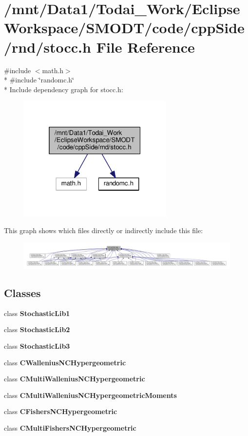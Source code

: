 \section{/mnt/\-Data1/\-Todai\-\_\-\-Work/\-Eclipse\-Workspace/\-S\-M\-O\-D\-T/code/cpp\-Side/rnd/stocc.h File Reference}
\label{rnd_2stocc_8h}
{\ttfamily \#include $<$math.\-h$>$}\\*
{\ttfamily \#include \char`\"{}randomc.\-h\char`\"{}}\\*
Include dependency graph for stocc.\-h\-:
\nopagebreak
\begin{figure}[H]
\begin{center}
\leavevmode
\includegraphics[width=220pt]{rnd_2stocc_8h__incl}
\end{center}
\end{figure}
This graph shows which files directly or indirectly include this file\-:
\nopagebreak
\begin{figure}[H]
\begin{center}
\leavevmode
\includegraphics[width=350pt]{rnd_2stocc_8h__dep__incl}
\end{center}
\end{figure}
\subsection*{Classes}
\begin{DoxyCompactItemize}
\item 
class {\bf Stochastic\-Lib1}
\item 
class {\bf Stochastic\-Lib2}
\item 
class {\bf Stochastic\-Lib3}
\item 
class {\bf C\-Wallenius\-N\-C\-Hypergeometric}
\item 
class {\bf C\-Multi\-Wallenius\-N\-C\-Hypergeometric}
\item 
class {\bf C\-Multi\-Wallenius\-N\-C\-Hypergeometric\-Moments}
\item 
class {\bf C\-Fishers\-N\-C\-Hypergeometric}
\item 
class {\bf C\-Multi\-Fishers\-N\-C\-Hypergeometric}
\end{DoxyCompactItemize}
